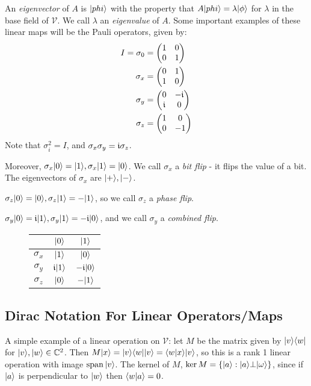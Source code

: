 \documentclass[10pt,a4paper]{article}
\begin{document}
An \emph{eigenvector} of $A$ is $|phi\rangle$ with the property that $A|phi\rangle = \lambda|\phi\rangle$ for $\lambda$ in the base field of $\mathcal{V}$. We call $\lambda$ an \emph{eigenvalue} of $A$. Some important examples of these linear maps will be the Pauli operators, given by:
\begin{align*}
I = \sigma_0 &= \begin{pmatrix}
1 & 0\\ 0 & 1
\end{pmatrix}\\
\sigma_x & = \begin{pmatrix}
0 & 1 \\ 1 & 0
\end{pmatrix}\\
\sigma_y &= \begin{pmatrix}
0 & -\mathfrak{i} \\ \mathfrak{i} & 0
\end{pmatrix}\\
\sigma_z &= \begin{pmatrix}
1 & 0 \\ 0 & -1
\end{pmatrix}
\end{align*}
Note that $\sigma_{i}^2 = I$, and $\sigma_x \sigma_y = \mathfrak{i} \sigma_z$.

Moreover, $\sigma_x|0\rangle = |1\rangle, \sigma_x|1\rangle = |0\rangle$. We call $\sigma_x$ a \emph{bit flip} - it flips the value of a bit. The eigenvectors of $\sigma_x$ are $|+\rangle, |-\rangle$.

\hspace*{-1em}$\sigma_z|0\rangle = |0\rangle, \sigma_z|1\rangle = -|1\rangle$, so we call $\sigma_z$ a \emph{phase flip}. 

\hspace*{-1em}$\sigma_y|0\rangle = \mathfrak{i}|1\rangle, \sigma_y|1\rangle=-\mathfrak{i}|0\rangle$, and we call $\sigma_y$ a \emph{combined flip}.
\begin{figure}[H]
\centering
\begin{tabular}{c|cc}
& $|0\rangle$ & $|1\rangle$\\\hline
$\sigma_x$ & $|1\rangle$ & $|0\rangle$\\
$\sigma_y$ & $\mathfrak{i}|1\rangle$ & $-\mathfrak{i}|0\rangle$\\
$\sigma_z$ & $|0\rangle$ & $-|1\rangle$
\end{tabular}
\end{figure}
\subsection{Dirac Notation For Linear Operators/Maps}
A simple example of a linear operation on $\mathcal{V}$: let $M$ be the matrix given by $|v\rangle\langle w|$ for $|v\rangle,|w\rangle \in \mathbb{C}^2$. Then $M|x\rangle = |v\rangle\langle w||v\rangle = \langle w | x \rangle|v\rangle$, so this is a rank 1 linear operation with image $\operatorname{span} |v\rangle$. The kernel of $M$, $\ker M = \{|a\rangle : |a\rangle \bot |\omega\rangle\}$, since if $|a\rangle$ is perpendicular to $|w\rangle$ then $\langle w | a \rangle = 0$.
\end{document}
